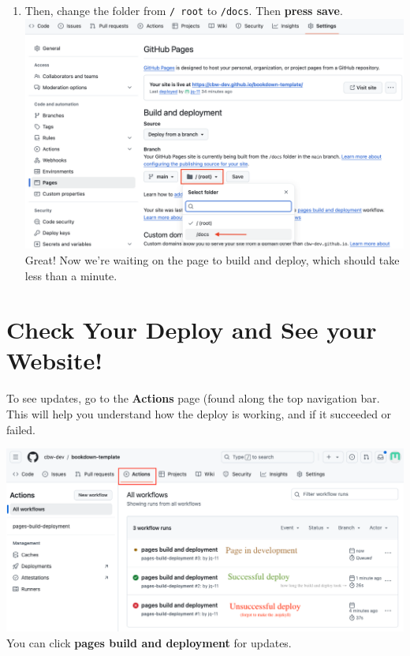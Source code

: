 \documentclass[
]{book}
\theoremstyle{definition}
\theoremstyle{definition}
\theoremstyle{definition}
\theoremstyle{definition}
\theoremstyle{remark}
\begin{document}
\begin{enumerate}
\item
  Then, change the folder from \texttt{/\ root} to \texttt{/docs}. Then \textbf{press save}.
  \includegraphics{img/git-instruct/github-deploy-docs.png}\\

  Great! Now we're waiting on the page to build and deploy, which should take less than a minute.
\end{enumerate}

\section{Check Your Deploy and See your Website!}\label{check-deploy}

To see updates, go to the \textbf{Actions} page (found along the top navigation bar. This will help you understand how the deploy is working, and if it succeeded or failed.

\includegraphics{img/git-instruct/github-pages-actions-explained.png}\\

You can click \textbf{pages build and deployment} for updates.
\end{document}
